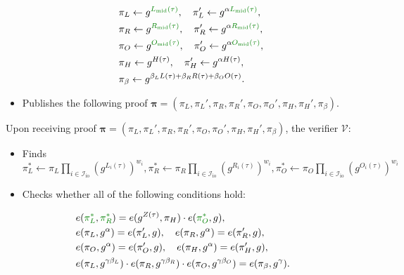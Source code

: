 \documentclass[../lecture-notes.tex]{subfiles}
\begin{document}
\begin{tcolorbox}
\begin{itemize}[label=, left=0mm]
        \begin{align*}
            &\pi_L \gets g^{\textcolor{green!50!black}{L_{\text{mid}}(\tau)}}, \quad \pi_L' \gets g^{\alpha \textcolor{green!50!black}{L_{\text{mid}}(\tau)}}, \\
            &\pi_R \gets g^{\textcolor{green!50!black}{R_{\text{mid}}(\tau)}}, \quad \pi_R' \gets g^{\alpha \textcolor{green!50!black}{R_{\text{mid}}(\tau)}}, \\
            &\pi_O \gets g^{\textcolor{green!50!black}{O_{\text{mid}}(\tau)}}, \quad \pi_O' \gets g^{\alpha \textcolor{green!50!black}{O_{\text{mid}}(\tau)}}, \\
            &\pi_H \gets g^{H(\tau)}, \quad \pi_H' \gets g^{\alpha H(\tau)}, \\
            &\pi_{\beta} \gets g^{\beta_LL(\tau) + \beta_RR(\tau) + \beta_OO(\tau)}.
        \end{align*}
        \item Publishes the following proof $\boldsymbol{\pi} = (\pi_L,\pi_L',\pi_R,\pi_R',\pi_O,\pi_O',\pi_H,\pi_H',\pi_{\beta})$.
    \end{itemize}

    Upon receiving proof $\boldsymbol{\pi} = (\pi_L,\pi_L',\pi_R,\pi_R',\pi_O,\pi_O',\pi_H,\pi_H',\pi_{\beta})$, the verifier $\mathcal{V}$:
    \begin{itemize}[label=]
        \item \textcolor{green!50!black}{Finds $\pi_L^* \gets \pi_L\prod_{i \in \mathcal{I}_{\text{io}}} (g^{L_i(\tau)})^{w_i},\pi_R^* \gets \pi_R\prod_{i \in \mathcal{I}_{\text{io}}} (g^{R_i(\tau)})^{w_i},\pi_O^* \gets \pi_O\prod_{i \in \mathcal{I}_{\text{io}}} (g^{O_i(\tau)})^{w_i}$}
        \item Checks whether all of the following conditions hold:
    \end{itemize}
    \begin{align*}
        &e(\textcolor{green!50!black}{\pi_L^*}, \textcolor{green!50!black}{\pi_R^*}) = e(g^{Z(\tau)}, \pi_H) \cdot e(\textcolor{green!50!black}{\pi_O^*}, g),\\
        &e(\pi_L, g^{\alpha}) = e(\pi_L', g), \quad e(\pi_R, g^{\alpha}) = e(\pi_R', g), \\
        &e(\pi_O, g^{\alpha}) = e(\pi_O', g), \quad e(\pi_H, g^{\alpha}) = e(\pi_H', g), \\
        &e(\pi_L, g^{\gamma\beta_L}) \cdot e(\pi_R, g^{\gamma\beta_R}) \cdot e(\pi_O, g^{\gamma\beta_O}) = e(\pi_{\beta}, g^{\gamma}).
    \end{align*}
\end{tcolorbox}
\end{document}

